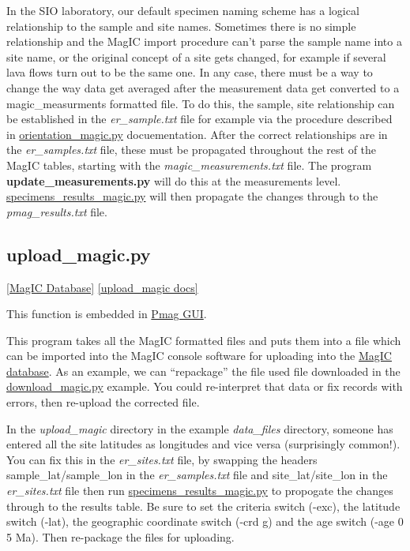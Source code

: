 \documentclass[11pt]{book}
\begin{document}
{In the SIO laboratory, our default specimen naming scheme has a logical relationship to the sample and site names.
Sometimes there is no simple relationship and the MagIC import procedure can't parse the sample name into a site name, or the original concept of a site gets changed, for example if several lava flows turn out to be the same one.  In any case, there must be a way to change the way data get averaged after the measurement data get converted to a magic\_measurments formatted file.  To do this, the sample, site relationship can be established in the {\it er\_sample.txt} file for example via the procedure described in \href{#orientation_magic.py}{orientation\_magic.py} docuementation.  After the correct relationships are in the {\it er\_samples.txt} file, these must be propagated throughout the rest of the MagIC tables, starting with the {\it magic\_measurements.txt} file.  The program {\bf update\_measurements.py} will do this at the measurements level.  \href{#specimens_results_magic.py}{specimens\_results\_magic.py} will then propagate the changes through to the {\it pmag\_results.txt} file.



\subsection{upload\_magic.py}
\href{#MagICDatabase}{[MagIC Database]}
\href{https://github.com/PmagPy/PmagPy/blob/master/programs/upload_magic.py}{[upload\_magic docs]}


 This function is embedded in  \href{#pmag_gui.py}{Pmag GUI}.   



This program takes all the MagIC formatted files and puts them into a file which can be imported into the MagIC console software for uploading into the \href{http://earthref.org/MagIC}{MagIC database}.
As an example, we can ``repackage'' the file used file downloaded in the \href{#download_magic.py}{download\_magic.py} example.  You could re-interpret that data or fix records with errors, then re-upload the corrected file.

In the {\it upload\_magic} directory in the example {\it data\_files} directory, someone has entered all the site latitudes as longitudes and vice versa (surprisingly common!).    You can fix this in the {\it er\_sites.txt} file, by swapping the headers sample\_lat/sample\_lon in the {\it er\_samples.txt} file and site\_lat/site\_lon in the {\it er\_sites.txt} file then run \href{#specimens\_results\_magic.py}{specimens\_results\_magic.py} to propogate the changes through to the results table.  Be sure to set the criteria switch (-exc), the latitude switch (-lat), the geographic coordinate switch (-crd g) and the age switch (-age 0 5 Ma).    Then re-package the files for uploading.

}
\end{document}
